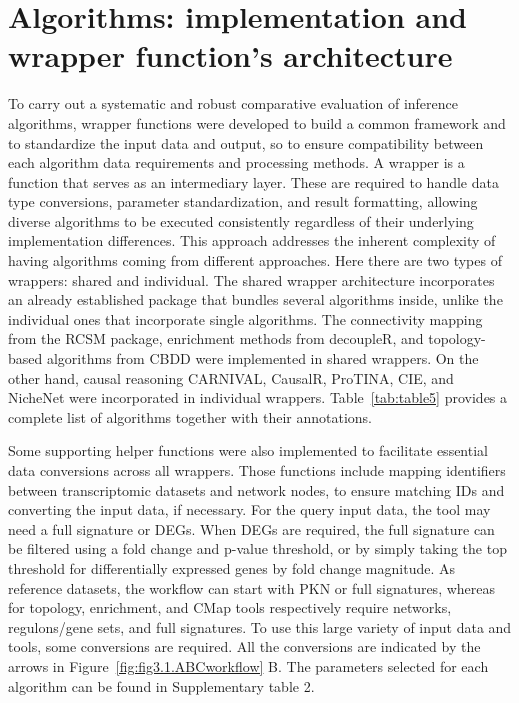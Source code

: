 \section{Algorithms: implementation and wrapper function's architecture} %
\label{sec:algorithms}

To carry out a systematic and robust comparative evaluation of inference algorithms, wrapper functions were developed to build a common framework and to standardize the input data and output, so to ensure compatibility between each algorithm data requirements and processing methods. 
A wrapper is a function that serves as an intermediary layer. 
These are required to handle data type conversions, parameter standardization, and result formatting, allowing diverse algorithms to be executed consistently regardless of their underlying implementation differences. This approach addresses the inherent complexity of having algorithms coming from different approaches. Here there are two types of wrappers: shared and individual. The shared wrapper architecture incorporates an already established package that bundles several algorithms inside, unlike the individual ones that incorporate single algorithms. The connectivity mapping from the RCSM package, enrichment methods from decoupleR, and topology-based algorithms from CBDD were implemented in shared wrappers. On the other hand, causal reasoning CARNIVAL, CausalR, ProTINA, CIE, and NicheNet were incorporated in individual wrappers. Table~\ref{tab:table5} provides a complete list of algorithms together with their annotations.

Some supporting helper functions were also implemented to facilitate essential data conversions across all wrappers. Those functions include mapping identifiers between transcriptomic datasets and network nodes, to ensure matching IDs and converting the input data, if necessary. For the query input data, the tool may need a full signature or DEGs. When DEGs are required, the full signature can be filtered using a fold change and p-value threshold, or by simply taking the top threshold for differentially expressed genes by fold change magnitude. As reference datasets, the workflow can start with PKN or full signatures, whereas for topology, enrichment, and CMap tools respectively require networks, regulons/gene sets, and full signatures. To use this large variety of input data and tools, some conversions are required. All the conversions are indicated by the arrows in Figure~\ref{fig:fig3.1.ABCworkflow} B. 
The parameters selected for each algorithm can be found in Supplementary table 2.

